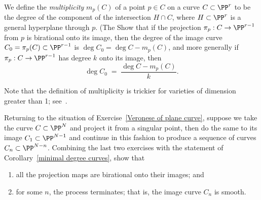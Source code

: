 \begin{exercise}
We define the \emph{multiplicity} $m_p(C)$ of a point $p \in C$ on a
%
curve $C \subset \PP^r$ to be the degree of the component of the
intersection $H \cap C$, where $H \subset \PP^r$ is a general
hyperplane through $p$. (The  
Show that if the projection $\pi_p : C \to \PP^{r-1}$ from $p$ is
birational onto its image, then the degree of the image curve $C_0 =
\pi_p(C) \subset \PP^{r-1}$ is $\deg C_0 = \deg C - m_p(C)$, and more
generally if $\pi_p : C \to \PP^{r-1}$ has degree $k$ onto its image, then
$$
\deg C_0 \; = \; \frac{\deg C - m_p(C)}{k}.
$$
\end{exercise}
Note that the definition of multiplicity is
trickier
for varieties of dimension greater than 1;
see~\cite{3264}.


\begin{exercise}\label{Mumford resolution argument}
Returning to the situation of Exercise~\ref{Veronese of plane curve}, suppose we take the curve $C \subset \PP^N$ and project it from a singular point, then do the same to its image $C_1 \subset \PP^{N-1}$ and continue in this fashion to produce a sequence of curves $C_n \subset \PP^{N-n}$. Combining the last two exercises with the statement of Corollary~\ref{minimal degree curves}, show that
\begin{enumerate}
\item 
all
the projection maps are birational onto their images; and
\item 
for
some $n$, the process terminates; that is, the image curve $C_n$ is smooth.
\end{enumerate}
\end{exercise}

 
